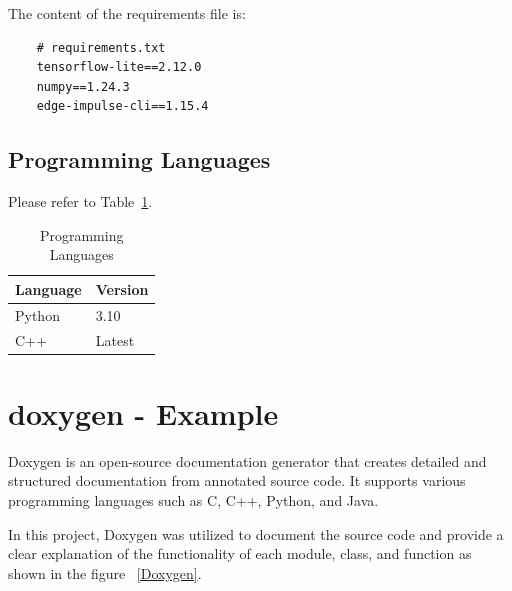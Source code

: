 \documentclass[12pt,a4paper]{scrbook}
\begin{document}
The content of the requirements file is:
\begin{verbatim}
	# requirements.txt
	tensorflow-lite==2.12.0
	numpy==1.24.3
	edge-impulse-cli==1.15.4
\end{verbatim}

\section{Programming Languages}
Please refer to Table~\ref{tab:programming-languages}.

\begin{table}[h!]
	\centering
	\caption{Programming Languages}
	\begin{tabular}{|l|l|}
		\hline
		\textbf{Language} & \textbf{Version} \\ \hline
		Python & 3.10 \\ \hline
		C++ & Latest \\ \hline
	\end{tabular}
	\label{tab:programming-languages}
\end{table}

\chapter{doxygen	 - Example}

Doxygen is an open-source documentation generator that creates detailed and structured documentation from annotated source code. It supports various programming languages such as C, C++, Python, and Java.	

In this project, Doxygen was utilized to document the source code and provide a clear explanation of the functionality of each module, class, and function as shown in the figure ~\ref{Doxygen}.
\end{document}

